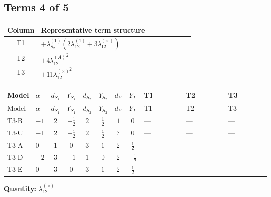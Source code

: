 \documentclass[8pt]{article}
\begin{document}
\begin{landscape}
\subsection*{Terms 4 of 5}
\begin{center}
\begin{tabular}{@{}c >{\raggedright\arraybackslash}p{0.82\linewidth}@{}}
\toprule
Column & Representative term structure \\
\midrule
T1 & \(\displaystyle +{\lambda_{S_2}^{(1)}} (2 {\lambda_{12}^{(1)}}+3 {\lambda_{12}^{(\times)}})\) \\
\midrule
T2 & \(\displaystyle +4 {\lambda_{12}^{(A)}}^2\) \\
\midrule
T3 & \(\displaystyle +11 {\lambda_{12}^{(\times)}}^2\) \\
\midrule
\bottomrule
\end{tabular}
\end{center}
\smallskip
\tiny
\begin{longtable}{@{}llcccccc >{\raggedright\arraybackslash}p{0.21\linewidth} >{\raggedright\arraybackslash}p{0.21\linewidth} >{\raggedright\arraybackslash}p{0.21\linewidth}@{}}
\toprule
Model & $\alpha$ & $d_{S_1}$ & $Y_{S_1}$ & $d_{S_2}$ & $Y_{S_2}$ & $d_F$ & $Y_F$ & T1 & T2 & T3 \\
\midrule
\endfirsthead
\toprule
Model & $\alpha$ & $d_{S_1}$ & $Y_{S_1}$ & $d_{S_2}$ & $Y_{S_2}$ & $d_F$ & $Y_F$ & T1 & T2 & T3 \\
\midrule
\endhead
T3-B & $-1$ & $2$ & $-\frac{1}{2}$ & $2$ & $\frac{1}{2}$ & $1$ & $0$ & --- & --- & --- \\
\midrule
T3-C & $-1$ & $2$ & $-\frac{1}{2}$ & $2$ & $\frac{1}{2}$ & $3$ & $0$ & --- & --- & --- \\
\midrule
T3-A & $0$ & $1$ & $0$ & $3$ & $1$ & $2$ & $\frac{1}{2}$ & --- & --- & --- \\
\midrule
T3-D & $-2$ & $3$ & $-1$ & $1$ & $0$ & $2$ & $-\frac{1}{2}$ & --- & --- & --- \\
\midrule
T3-E & $0$ & $3$ & $0$ & $3$ & $1$ & $2$ & $\frac{1}{2}$ & \scriptsize\adjustbox{max width=\linewidth}{$\begin{gathered} +{\lambda_{S_2}^{(1)}} (2 {\lambda_{12}^{(1)}}+3 {\lambda_{12}^{(\times)}})\end{gathered}$} & \scriptsize\adjustbox{max width=\linewidth}{$\begin{gathered} +4 {\lambda_{12}^{(A)}}^2\end{gathered}$} & \scriptsize\adjustbox{max width=\linewidth}{$\begin{gathered} +11 {\lambda_{12}^{(\times)}}^2\end{gathered}$} \\
\midrule
\bottomrule
\end{longtable}
\clearpage
\noindent\textbf{Quantity: }$\lambda_{12}^{(\times)}$\par\smallskip

\end{landscape}
\end{document}
